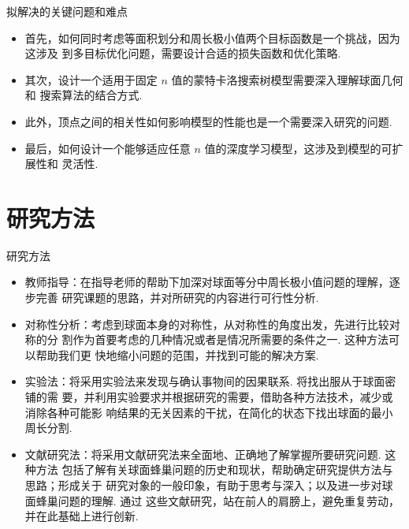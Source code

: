 \documentclass[12pt,aspectratio=169]{beamer}
\begin{document}
\begin{frame}{拟解决的关键问题和难点}

  \begin{itemize}
    \item 首先，如何同时考虑{\color{ECNURed}等面积划分和周长极小值两个目标函数}是一个挑战，因为这涉及
          到多目标优化问题，需要设计合适的损失函数和优化策略. 

    \item 其次，设计一个适用于{\color{ECNURed}固定 $n$ 值}的蒙特卡洛搜索树模型需要深入理解球面几何和
          搜索算法的结合方式. 

    \item 此外，{\color{ECNURed}顶点之间的相关性}如何影响模型的性能也是一个需要深入研究的问题. 

    \item 最后，如何设计一个能够适应{\color{ECNURed}任意 $n$ 值}的深度学习模型，这涉及到模型的可扩展性和
          灵活性. 
  \end{itemize}

\end{frame}

\section{研究方法}

\begin{frame}{研究方法}

  \begin{itemize}
    \item {\color{ECNURed}教师指导}：在指导老师的帮助下加深对球面等分中周长极小值问题的理解，逐步完善
          研究课题的思路，并对所研究的内容进行可行性分析. 

    \item {\color{ECNURed}对称性分析}：考虑到球面本身的对称性，从对称性的角度出发，先进行比较对称的分
          割作为首要考虑的几种情况或者是情况所需要的条件之一. 这种方法可以帮助我们更
          快地缩小问题的范围，并找到可能的解决方案. 

    \item {\color{ECNURed}实验法}：将采用实验法来发现与确认事物间的因果联系. 将找出服从于球面密铺的需
          要，并利用实验要求并根据研究的需要，借助各种方法技术，减少或消除各种可能影
          响结果的无关因素的干扰，在简化的状态下找出球面的最小周长分割. 

    \item {\color{ECNURed}文献研究法}：将采用文献研究法来全面地、正确地了解掌握所要研究问题. 这种方法
          包括了解有关球面蜂巢问题的历史和现状，帮助确定研究提供方法与思路；形成关于
          研究对象的一般印象，有助于思考与深入；以及进一步对球面蜂巢问题的理解. 通过
          这些文献研究，站在前人的肩膀上，避免重复劳动，并在此基础上进行创新. 
  \end{itemize}

\end{frame}
\end{document}
